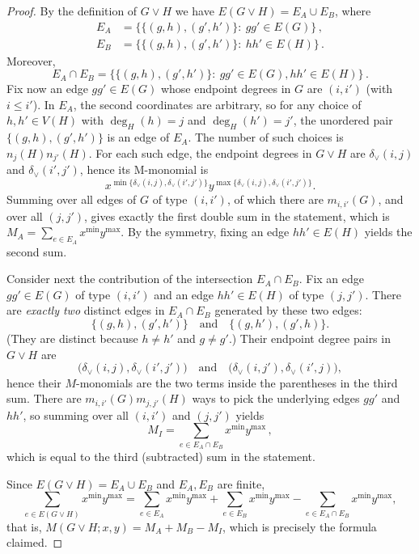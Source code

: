 \documentclass[letterpaper,12pt]{article}
\begin{document}
\begin{proof}
By the definition of $G\vee H$ we have $E(G\vee H)=E_A\cup E_B$, 
where
\begin{align*}
E_A & = \bigl\{\{(g,h),(g',h')\}:\ gg'\in E(G)\bigr\}\,, \\
E_B & = \bigl\{\{(g,h),(g',h')\}:\ hh'\in E(H)\bigr\}\,.
\end{align*}
Moreover,
\[
E_A\cap E_B
=\bigl\{\{(g,h),(g',h')\}:\ gg'\in E(G), hh'\in E(H)\bigr\}\,.
\]
Fix now an edge $gg'\in E(G)$ whose endpoint degrees in $G$ are $(i,i')$ (with $i\le i'$).
In $E_A$, the second coordinates are arbitrary, so for any choice of
$h,h'\in V(H)$ with $\deg_H(h)=j$ and $\deg_H(h')=j'$, the unordered pair
$\{(g,h),(g',h')\}$ is an edge of $E_A$.
The number of such choices is $n_j(H) n_{j'}(H)$.
For each such edge, the endpoint degrees in $G\vee H$ are
$\delta_\vee(i,j)$ and $\delta_\vee(i',j')$, hence its M-monomial is
\[
x^{\min\{\delta_\vee(i,j),\delta_\vee(i',j')\}}
y^{\max\{\delta_\vee(i,j),\delta_\vee(i',j')\}}.
\]
Summing over all edges of $G$ of type $(i,i')$, of which there are $m_{i,i'}(G)$,
and over all $(j,j')$, gives exactly the first double sum in the statement, which is
$M_A=\sum_{e\in E_A}x^{\min}y^{\max}$. By the symmetry, fixing an edge $hh'\in E(H)$ yields the second sum. 

Consider next the contribution of the intersection $E_A\cap E_B$. 
Fix an edge $gg'\in E(G)$ of type $(i,i')$ and an edge $hh'\in E(H)$ of type $(j,j')$.
There are \emph{exactly two} distinct edges in $E_A\cap E_B$ generated by these two edges:
\[
\{(g,h),(g',h')\}
\quad\text{and}\quad
\{(g,h'),(g',h)\}.
\]
(They are distinct because $h\neq h'$ and $g\neq g'$.)
Their endpoint degree pairs in $G\vee H$ are
\[
\bigl(\delta_\vee(i,j),\delta_\vee(i',j')\bigr)
\quad\text{and}\quad
\bigl(\delta_\vee(i,j'),\delta_\vee(i',j)\bigr),
\]
hence their $M$-monomials are the two terms inside the parentheses in the third sum.
There are $m_{i,i'}(G)m_{j,j'}(H)$ ways to pick the underlying edges $gg'$ and $hh'$,
so summing over all $(i,i')$ and $(j,j')$ yields
\[
M_I=\sum_{e\in E_A\cap E_B}x^{\min}y^{\max}\,,
\]
which is equal to the third (subtracted) sum in the statement.

Since $E(G\vee H)=E_A\cup E_B$ and $E_A,E_B$ are finite,
\[
\sum_{e\in E(G\vee H)}x^{\min}y^{\max}
=
\sum_{e\in E_A}x^{\min}y^{\max}
+
\sum_{e\in E_B}x^{\min}y^{\max}
-
\sum_{e\in E_A\cap E_B}x^{\min}y^{\max},
\]
that is, $M(G\vee H;x,y)=M_A+M_B-M_I$, which is precisely the formula claimed.
\qedhere
\end{proof}
\end{document}
